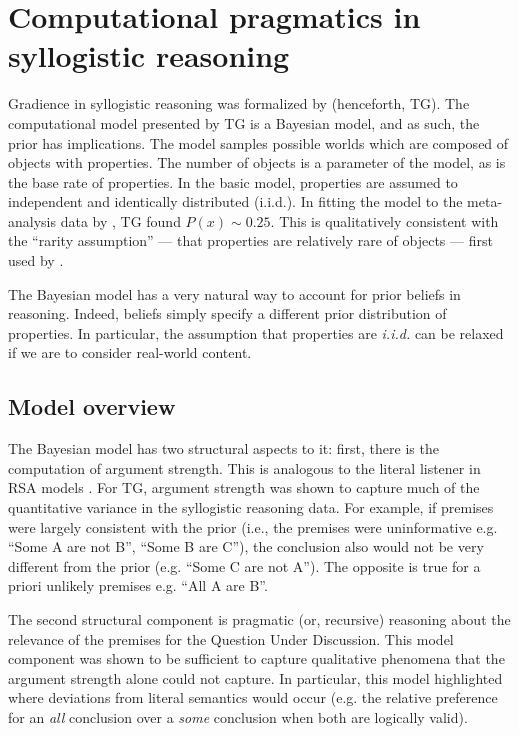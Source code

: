 \documentclass{llncs} %
\begin{document}
\section{Computational pragmatics in syllogistic reasoning}

Gradience in syllogistic reasoning was formalized by  (henceforth, TG). The computational model presented by TG is a Bayesian model, and as such, the prior has implications. The model samples possible worlds which are composed of objects with properties. The number of objects is a parameter of the model, as is the base rate of properties. In the basic model, properties are assumed to independent and identically distributed (i.i.d.). In fitting the model to the meta-analysis data by , TG found $P(x) \sim 0.25$. This is qualitatively consistent with the ``rarity assumption'' --- that properties are relatively rare of objects --- first used by .

The Bayesian model has a very natural way to account for prior beliefs in reasoning. Indeed, beliefs simply specify a different prior distribution of properties. In particular, the assumption that properties are \emph{i.i.d.} can be relaxed if we are to consider real-world content.

\subsection{Model overview}

The Bayesian model has two structural aspects to it: first, there is the computation of argument strength. This is analogous to the literal listener in RSA models \cite{Frank2012,Goodman2013}. For TG,  argument strength was shown to capture much of the quantitative variance in the syllogistic reasoning data. For example, if premises were largely consistent with the prior (i.e., the premises were uninformative e.g. ``Some A are not B'', ``Some B are C''), the conclusion also would not be very different from the prior (e.g. ``Some C are not A''). The opposite is true for a priori unlikely premises e.g. ``All A are B''.  

The second structural component is pragmatic (or, recursive) reasoning about the relevance of the premises for the Question Under Discussion. This model component was shown to be sufficient to capture qualitative phenomena that the argument strength alone could not capture. In particular, this model highlighted where deviations from literal semantics would occur (e.g. the relative preference for an \emph{all} conclusion over a \emph{some} conclusion when both are logically valid). 
\end{document}
